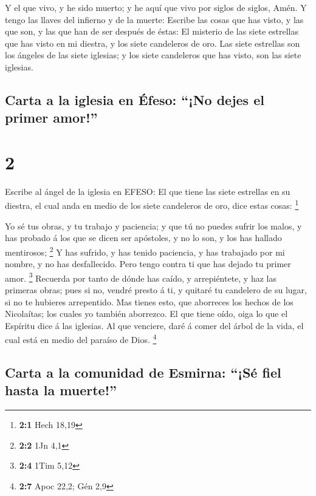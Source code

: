  Y el que vivo, y he sido muerto; y he aquí que vivo por
siglos de siglos, Amén. Y tengo las llaves del infierno y de la muerte:
 Escribe las cosas que has visto, y las que son, y las que
han de ser después de éstas:  El misterio de las siete
estrellas que has visto en mi diestra, y los siete candeleros de oro.
Las siete estrellas son los ángeles de las siete iglesias; y los siete
candeleros que has visto, son las siete iglesias.

\hypertarget{carta-a-la-iglesia-en-uxe9feso-no-dejes-el-primer-amor}{%
\subsection{Carta a la iglesia en Éfeso: ``¡No dejes el primer
amor!''}\label{carta-a-la-iglesia-en-uxe9feso-no-dejes-el-primer-amor}}

\hypertarget{section-1}{%
\section{2}\label{section-1}}

 Escribe al ángel de la iglesia en EFESO: El que tiene las
siete estrellas en su diestra, el cual anda en medio de los siete
candeleros de oro, dice estas cosas: \footnote{\textbf{2:1} Hech 18,19}

 Yo sé tus obras, y tu trabajo y paciencia; y que tú no
puedes sufrir los malos, y has probado á los que se dicen ser apóstoles,
y no lo son, y los has hallado mentirosos; \footnote{\textbf{2:2} 1Jn
  4,1}  Y has sufrido, y has tenido paciencia, y has
trabajado por mi nombre, y no has desfallecido.  Pero tengo
contra ti que has dejado tu primer amor. \footnote{\textbf{2:4} 1Tim
  5,12}  Recuerda por tanto de dónde has caído, y
arrepiéntete, y haz las primeras obras; pues si no, vendré presto á ti,
y quitaré tu candelero de su lugar, si no te hubieres arrepentido.
 Mas tienes esto, que aborreces los hechos de los
Nicolaítas; los cuales yo también aborrezco.  El que tiene
oído, oiga lo que el Espíritu dice á las iglesias. Al que venciere, daré
á comer del árbol de la vida, el cual está en medio del paraíso de Dios.
\footnote{\textbf{2:7} Apoc 22,2; Gén 2,9}

\hypertarget{carta-a-la-comunidad-de-esmirna-suxe9-fiel-hasta-la-muerte}{%
\subsection{Carta a la comunidad de Esmirna: ``¡Sé fiel hasta la
muerte!''}\label{carta-a-la-comunidad-de-esmirna-suxe9-fiel-hasta-la-muerte}}

